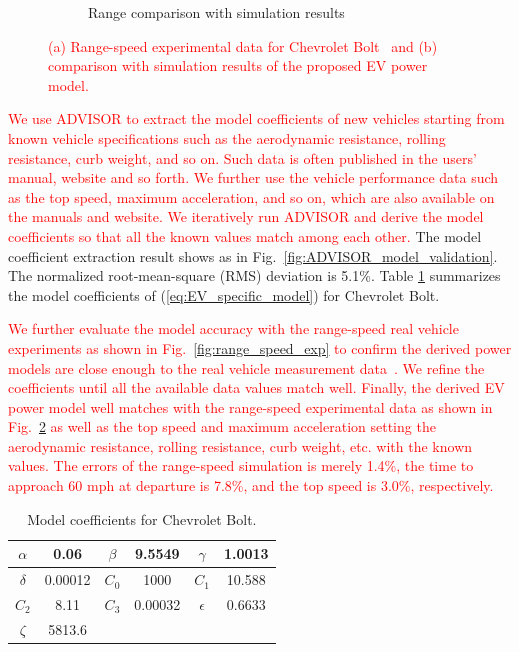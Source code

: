 \documentclass{IEEEtran}
\begin{document}
\begin{figure}
\begin{subfigure}{0.4\textwidth}
	\caption{Range comparison with simulation results}
	\label{fig:range_speed_valid}
	\end{subfigure}
\caption{\textcolor{red}{(a) Range-speed experimental data for Chevrolet Bolt~\cite{GM_Bolt:range_speed} and (b) comparison with simulation results of the proposed EV power model.}}
\end{figure}

\textcolor{red}{We use ADVISOR to extract the model coefficients of new vehicles starting from known vehicle specifications such as the aerodynamic resistance, rolling resistance, curb weight, and so on. Such data is often published in the users' manual, website and so forth. We further use the vehicle performance data such as the top speed, maximum acceleration, and so on, which are also available on the manuals and website. We iteratively run ADVISOR and derive the model coefficients so that all the known values match among each other.}
The model coefficient extraction result shows as in Fig.~\ref{fig:ADVISOR_model_validation}. The normalized root-mean-square (RMS) deviation is 5.1\%. Table \ref{table:Coeff_Bolt} summarizes the model coefficients of (\ref{eq:EV_specific_model}) for Chevrolet Bolt. 

\textcolor{red}{We further evaluate the model accuracy with the range-speed real vehicle experiments as shown in Fig.~\ref{fig:range_speed_exp} to confirm the derived power models are close enough to the real vehicle measurement data~\cite{GM_Bolt:range25mph,GM_Bolt:range65mph,GM_Bolt:range75mph,GM_Bolt:range93mph,GM_Bolt:range_speed}. We  refine the coefficients until all the available data values match well. Finally, the derived EV power model well matches with the range-speed experimental data as shown in Fig.~\ref{fig:range_speed_valid} as well as the top speed and maximum acceleration setting the aerodynamic resistance, rolling resistance, curb weight, etc. with the known values. The errors of the range-speed simulation is merely 1.4\%, the time to approach 60 mph at departure is 7.8\%, and the top speed is 3.0\%, respectively.} 

\begin{table}
\caption{Model coefficients for Chevrolet Bolt.}
\label{table:Coeff_Bolt}
\centering
\begin{tabular}{|c|c|c|c|c|c|}  \hline
$\alpha$	&0.06		&$\beta$	&9.5549	&$\gamma$	&1.0013	\\ \hline
$\delta$	&0.00012 		&$C_0$	&1000 	&$C_1$		&10.588	\\ \hline
$C_2$	&8.11		&$C_3$	&0.00032	&$\epsilon$	&0.6633	\\ \hline
$\zeta$	&5813.6		\\ \cline{1-2}
\end{tabular}
\end{table}
\end{document}
